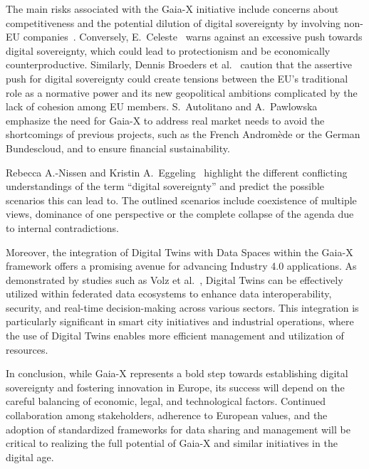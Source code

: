 The main risks associated with the Gaia-X initiative include concerns about competitiveness and the potential dilution of digital sovereignty by involving non-EU companies~\cite{europe_quest_for_digital_sovereignty}.
Conversely, E.~Celeste~\cite{dig_sovereignty_challenges} warns against an excessive push towards digital sovereignty, which could lead to protectionism and be economically counterproductive.
Similarly, Dennis Broeders et al.~\cite{digital_sovereignty_and_strategic_autonomy} caution that the assertive push for digital sovereignty could create tensions between the EU’s traditional role as a normative power and its new geopolitical ambitions complicated by the lack of cohesion among EU members.
S.~Autolitano and A.~Pawlowska~\cite{europe_quest_for_digital_sovereignty} emphasize the need for Gaia-X to address real market needs to avoid the shortcomings of previous projects, such as the French Andromède or the German Bundescloud, and to ensure financial sustainability.

Rebecca A.-Nissen and Kristin A.~Eggeling~\cite{discursive_struggle_for_digital_sovereignty} highlight the different conflicting understandings of the term ``digital sovereignty'' and predict the possible scenarios this can lead to.
The outlined scenarios include coexistence of multiple views, dominance of one perspective or the complete collapse of the agenda due to internal contradictions.

Moreover, the integration of Digital Twins with Data Spaces within the Gaia-X framework offers a promising avenue for advancing Industry 4.0 applications.
As demonstrated by studies such as Volz et al.~\cite{role_of_digital_twins_in_data_spaces}, Digital Twins can be effectively utilized within federated data ecosystems to enhance data interoperability, security, and real-time decision-making across various sectors.
This integration is particularly significant in smart city initiatives and industrial operations, where the use of Digital Twins enables more efficient management and utilization of resources.

In conclusion, while Gaia-X represents a bold step towards establishing digital sovereignty and fostering innovation in Europe, its success will depend on the careful balancing of economic, legal, and technological factors.
Continued collaboration among stakeholders, adherence to European values, and the adoption of standardized frameworks for data sharing and management will be critical to realizing the full potential of Gaia-X and similar initiatives in the digital age.
